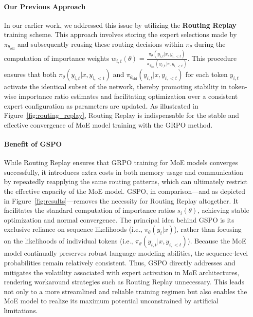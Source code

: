 \paragraph{Our Previous Approach} In our earlier work, we addressed this issue by utilizing the \textbf{Routing Replay} training scheme. This approach involves storing the expert selections made by $\pi_{\theta_\text{old}}$ and subsequently reusing these routing decisions within $\pi_{\theta}$ during the computation of importance weights $w_{i,t}(\theta) = \frac{ \pi_{\theta} (y_{i,t} | x, y_{i,<t}) }{ \pi_{\theta_\text{old}} (y_{i,t} | x,y_{i,<t})}$. This procedure ensures that both $\pi_{\theta} (y_{i,t} | x, y_{i,<t})$ and $\pi_{\theta_\text{old}} (y_{i,t} | x,y_{i,<t})$ for each token $y_{i,t}$ activate the identical subset of the network, thereby promoting stability in token-wise importance ratio estimates and facilitating optimization over a consistent expert configuration as parameters are updated. As illustrated in Figure~\ref{fig:routing_replay}, Routing Replay is indispensable for the stable and effective convergence of MoE model training with the GRPO method.

\paragraph{Benefit of GSPO} While Routing Replay ensures that GRPO training for MoE models converges successfully, it introduces extra costs in both memory usage and communication by repeatedly reapplying the same routing patterns, which can ultimately restrict the effective capacity of the MoE model. GSPO, in comparison—and as depicted in Figure~\ref{fig:results}—removes the necessity for Routing Replay altogether. It facilitates the standard computation of importance ratios $s_i(\theta)$, achieving stable optimization and normal convergence. The principal idea behind GSPO is its exclusive reliance on sequence likelihoods (i.e., $\pi_{\theta} (y_i | x)$), rather than focusing on the likelihoods of individual tokens (i.e., $\pi_{\theta} (y_{i,t} | x, y_{i,<t})$). Because the MoE model continually preserves robust language modeling abilities, the sequence-level probabilities remain relatively consistent. Thus, GSPO directly addresses and mitigates the volatility associated with expert activation in MoE architectures, rendering workaround strategies such as Routing Replay unnecessary. This leads not only to a more streamlined and reliable training regimen but also enables the MoE model to realize its maximum potential unconstrained by artificial limitations.

